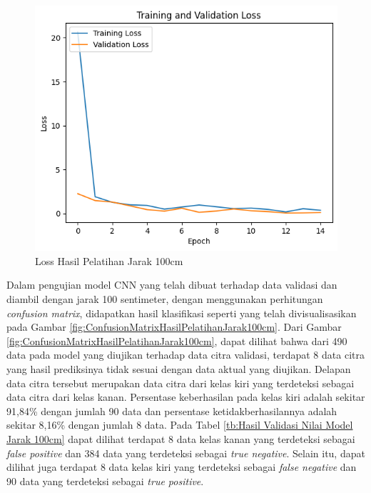 \begin{figure} [H] \centering
  \includegraphics[scale=0.7]{gambar/100loss.png}
  \caption{Loss Hasil Pelatihan Jarak 100cm}
  \label{fig:LossHasilPelatihanJarak100cm}
\end{figure}


Dalam pengujian model CNN yang telah dibuat terhadap data validasi dan diambil dengan jarak 100 sentimeter, dengan menggunakan perhitungan \emph{confusion matrix}, didapatkan hasil klasifikasi seperti yang telah divisualisasikan pada Gambar \ref{fig:ConfusionMatrixHasilPelatihanJarak100cm}. Dari Gambar \ref{fig:ConfusionMatrixHasilPelatihanJarak100cm}, dapat dilihat bahwa dari 490 data pada model yang diujikan terhadap data citra validasi, terdapat 8 data citra yang hasil prediksinya tidak sesuai dengan data aktual yang diujikan. Delapan data citra tersebut merupakan data citra dari kelas kiri yang terdeteksi sebagai data citra dari kelas kanan. Persentase keberhasilan pada kelas kiri adalah sekitar 91,84\% dengan jumlah 90 data dan persentase ketidakberhasilannya adalah sekitar 8,16\% dengan jumlah 8 data. Pada Tabel \ref{tb:Hasil Validasi Nilai Model Jarak 100cm} dapat dilihat terdapat 8 data kelas kanan yang terdeteksi sebagai \emph{false positive} dan 384 data yang terdeteksi sebagai \emph{true negative}. Selain itu, dapat dilihat juga terdapat 8 data kelas kiri yang terdeteksi sebagai \emph{false negative} dan 90 data yang terdeteksi sebagai \emph{true positive}.

